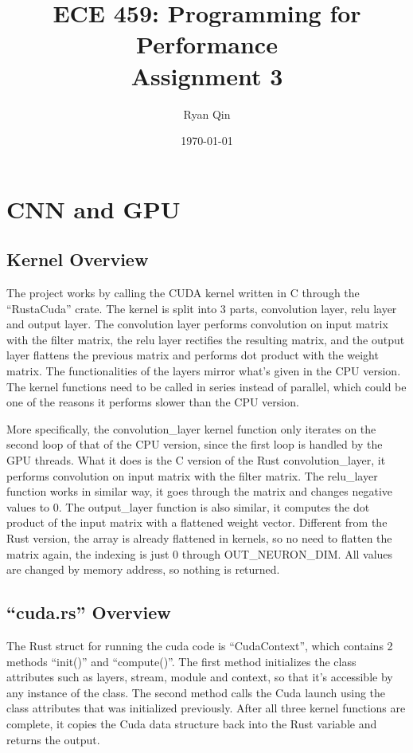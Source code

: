 \documentclass[12pt]{article}
\title{ECE 459: Programming for Performance\\Assignment 3}
\author{Ryan Qin}
\date{\today}
\begin{document}
\maketitle

\section{CNN and GPU}

    \subsection{Kernel Overview}

    The project works by calling the CUDA kernel written in C through the ``RustaCuda'' crate.
    The kernel is split into 3 parts, convolution layer, relu layer and output layer.
    The convolution layer performs convolution on input matrix with the filter matrix, the relu layer rectifies the resulting matrix, and the output layer flattens the previous matrix and performs dot product with the weight matrix.
    The functionalities of the layers mirror what's given in the CPU version.
    The kernel functions need to be called in series instead of parallel, which could be one of the reasons it performs slower than the CPU version.

    More specifically, the convolution\_layer kernel function only iterates on the second loop of that of the CPU version, since the first loop is handled by the GPU threads.
    What it does is the C version of the Rust convolution\_layer, it performs convolution on input matrix with the filter matrix.
    The relu\_layer function works in similar way, it goes through the matrix and changes negative values to 0.
    The output\_layer function is also similar, it computes the dot product of the input matrix with a flattened weight vector.
    Different from the Rust version, the array is already flattened in kernels, so no need to flatten the matrix again, the indexing is just 0 through OUT\_NEURON\_DIM.
    All values are changed by memory address, so nothing is returned.

    \subsection{``cuda.rs'' Overview}

    The Rust struct for running the cuda code is ``CudaContext'', which contains 2 methods ``init()'' and ``compute()''.
    The first method initializes the class attributes such as layers, stream, module and context, so that it's accessible by any instance of the class.
    The second method calls the Cuda launch using the class attributes that was initialized previously.
    After all three kernel functions are complete, it copies the Cuda data structure back into the Rust variable and returns the output.
\end{document}
